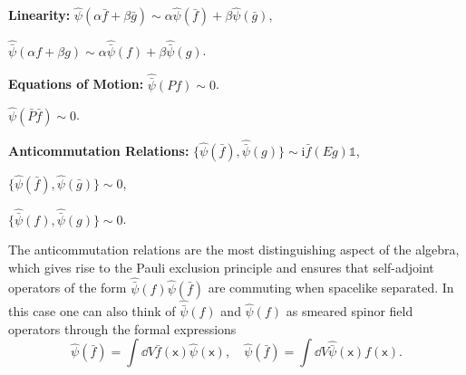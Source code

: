 \documentclass[letterpaper,12pt,titlepage,oneside,final]{book}
\newcommand{\openone}{\mathds{1}}
\newcommand{\mf}{\mathsf}%
\newcommand{\ii}{\mathrm{i}}
\begin{document}
\noindent \textbf{Linearity:} $\hat{\psi}(\alpha \bar{f} + \beta \bar{g}) \sim\alpha\hat{\psi}(\bar{f}) + \beta \hat{\psi}(\bar{g})$,

\:\:\:\:\:\:\:\:\:\:\:\:\:\:\:\:\:\:\noindent $\hat{\bar{\psi}}(\alpha f + \beta g) \sim\alpha\hat{\bar{\psi}}(f) + \beta \hat{\bar{\psi}}(g)$.

\noindent \textbf{Equations of Motion:} $\hat{\bar{\psi}}(Pf) \sim 0$.

\:\:\:\:\:\:\:\:\:\:\:\:\:\:\:\:\:\:\:\:\:\:\:\:\:\:\:\:\:\:\:\:\:\:\:\:\:\:\:\:\:\:\:\noindent  $\hat{\psi}(\bar{P}\bar{f}) \sim 0$.

\noindent \textbf{Anticommutation Relations:} $\{\hat{\psi}(\bar{f}),\hat{\bar{\psi}}(g)\} \sim \ii \bar{f}(E g)\openone$,

\:\:\:\:\:\:\:\:\:\:\:\:\:\:\:\:\:\:\:\:\:\:\:\:\:\:\:\:\:\:\:\:\:\:\:\:\:\:\:\:\:\:\:\:\:\:\:\:\:\:\:\:\:\:\:\:\:\:\:\noindent $\{\hat{\psi}(\bar{f}),\hat{\psi}(\bar{g})\} \sim 0$,

\:\:\:\:\:\:\:\:\:\:\:\:\:\:\:\:\:\:\:\:\:\:\:\:\:\:\:\:\:\:\:\:\:\:\:\:\:\:\:\:\:\:\:\:\:\:\:\:\:\:\:\:\:\:\:\:\:\:\:\noindent $\{\hat{\bar{\psi}}(f),\hat{\bar{\psi}}(g)\} \sim 0$.

\noindent The anticommutation relations are the most distinguishing aspect of the algebra, which gives rise to the Pauli exclusion principle and ensures that self-adjoint operators of the form $\hat{\bar{\psi}}(f)\hat{\psi}(\bar{f})$ are commuting when spacelike separated. In this case one can also think of $\hat{\bar{\psi}}(f)$ and $\hat{\psi}(f)$ as smeared spinor field operators through the formal expressions
\begin{equation}
    \hat{\psi}(\bar{f}) = \int \dd V \bar{f}(\mf x)\hat{\psi}(\mf x), \quad 
    \hat{\psi}(\bar{f}) = \int \dd V \hat{\bar{\psi}}(\mf x) f(\mf x). 
\end{equation}
\end{document}
